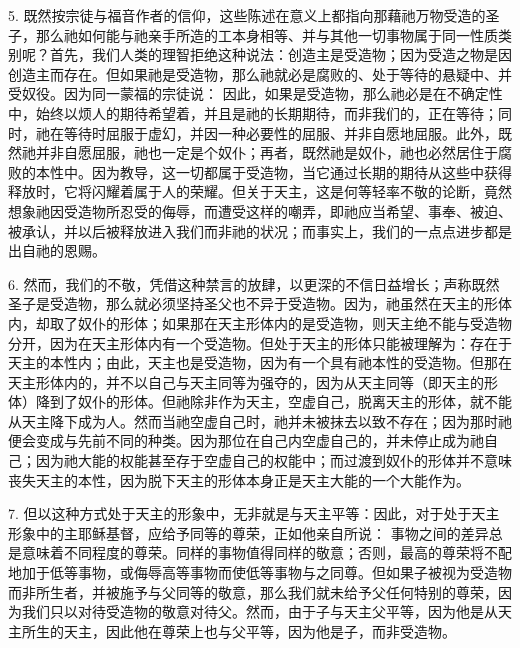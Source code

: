 5. 既然按宗徒与福音作者的信仰，这些陈述在意义上都指向那藉祂万物受造的圣子，那么祂如何能与祂亲手所造的工本身相等、并与其他一切事物属于同一性质类别呢？首先，我们人类的理智拒绝这种说法：创造主是受造物；因为受造之物是因创造主而存在。但如果祂是受造物，那么祂就必是腐败的、处于等待的悬疑中、并受奴役。因为同一蒙福的宗徒说： 因此，如果是受造物，那么祂必是在不确定性中，始终以烦人的期待希望着，并且是祂的长期期待，而非我们的，正在等待；同时，祂在等待时屈服于虚幻，并因一种必要性的屈服、并非自愿地屈服。此外，既然祂并非自愿屈服，祂也一定是个奴仆；再者，既然祂是奴仆，祂也必然居住于腐败的本性中。因为教导，这一切都属于受造物，当它通过长期的期待从这些中获得释放时，它将闪耀着属于人的荣耀。但关于天主，这是何等轻率不敬的论断，竟然想象祂因受造物所忍受的侮辱，而遭受这样的嘲弄，即祂应当希望、事奉、被迫、被承认，并以后被释放进入我们而非祂的状况；而事实上，我们的一点点进步都是出自祂的恩赐。\par

6. 然而，我们的不敬，凭借这种禁言的放肆，以更深的不信日益增长；声称既然圣子是受造物，那么就必须坚持圣父也不异于受造物。因为，祂虽然在天主的形体内，却取了奴仆的形体；如果那在天主形体内的是受造物，则天主绝不能与受造物分开，因为在天主形体内有一个受造物。但处于天主的形体只能被理解为：存在于天主的本性内；由此，天主也是受造物，因为有一个具有祂本性的受造物。但那在天主形体内的，并不以自己与天主同等为强夺的，因为从天主同等（即天主的形体）降到了奴仆的形体。但祂除非作为天主，空虚自己，脱离天主的形体，就不能从天主降下成为人。然而当祂空虚自己时，祂并未被抹去以致不存在；因为那时祂便会变成与先前不同的种类。因为那位在自己内空虚自己的，并未停止成为祂自己；因为祂大能的权能甚至存于空虚自己的权能中；而过渡到奴仆的形体并不意味丧失天主的本性，因为脱下天主的形体本身正是天主大能的一个大能作为。\par

7. 但以这种方式处于天主的形象中，无非就是与天主平等：因此，对于处于天主形象中的主耶稣基督，应给予同等的尊荣，正如他亲自所说： 事物之间的差异总是意味着不同程度的尊荣。同样的事物值得同样的敬意；否则，最高的尊荣将不配地加于低等事物，或侮辱高等事物而使低等事物与之同尊。但如果子被视为受造物而非所生者，并被施予与父同等的敬意，那么我们就未给予父任何特别的尊荣，因为我们只以对待受造物的敬意对待父。然而，由于子与天主父平等，因为他是从天主所生的天主，因此他在尊荣上也与父平等，因为他是子，而非受造物。\par

